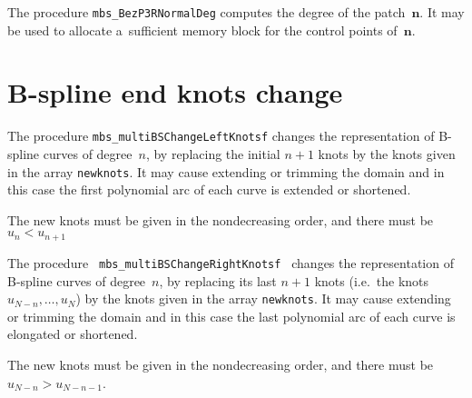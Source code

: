 \vspace{\smallskipamount}
The procedure \texttt{mbs\_BezP3RNormalDeg} computes the degree of the
patch~$\bm{n}$. It may be used to allocate a~sufficient memory block for
the control points of~$\bm{n}$.


\clearpage
\section{B-spline end knots change}

\begin{sloppypar}
\hspace{\parindent}%
The procedure \texttt{mbs\_multiBSChangeLeftKnotsf} changes the representation
of B-spline curves of degree~$n$, by replacing the initial $n+1$ knots
by the knots given in the array \texttt{newknots}. It may cause
extending or trimming the domain and in this case the first
polynomial arc of each curve is extended or shortened.
\end{sloppypar}

The new knots must be given in the nondecreasing order, and there must be
$u_n<u_{n+1}$

\vspace{\bigskipamount}
\begin{sloppypar}
The procedure \texttt{ mbs\_multiBSChangeRightKnotsf } changes the representation
of B-spline curves of degree~$n$, by replacing its last $n+1$ knots
(i.e.\ the knots $u_{N-n},\ldots,u_N$) by the knots given in the array
\texttt{newknots}. It may cause extending or trimming the domain and in this
case the last polynomial arc of each curve is elongated or shortened.
\end{sloppypar}

The new knots must be given in the nondecreasing order, and there must be
$u_{N-n}>u_{N-n-1}$.

